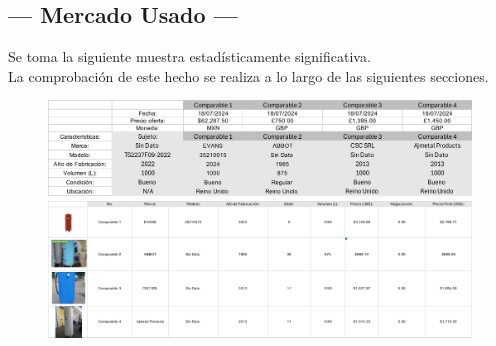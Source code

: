 \subsection{\centering --- Mercado Usado ---} %
Se toma la siguiente muestra estadísticamente significativa. \\ 
La comprobación de este hecho se realiza a lo largo de las siguientes secciones.
\begin{figure}[hbtp!]
	\centering
\includegraphics[width=  \linewidth, page = 1]{../0.imagenes/CAP_8/mercado_1_1}
\includegraphics[width=  \linewidth, page = 1]{../0.imagenes/CAP_8/mercado_1_2}
\end{figure}

